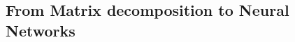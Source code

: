 %
%



\subsection{From Matrix decomposition to Neural Networks}
\label{subsection:ch4-from_matrix_decomposition_to_neural_networks}


